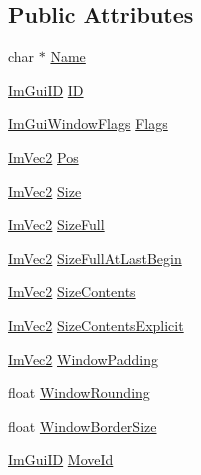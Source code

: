 \subsection*{Public Attributes}
\begin{DoxyCompactItemize}
\item 
char $\ast$ \mbox{\hyperlink{struct_im_gui_window_ab44252eb7d02d3f38249f5bac605037c}{Name}}
\item 
\mbox{\hyperlink{imgui_8h_a1785c9b6f4e16406764a85f32582236f}{Im\+Gui\+ID}} \mbox{\hyperlink{struct_im_gui_window_a5976b8d78bcc543ad7f23561f5cf0b8f}{ID}}
\item 
\mbox{\hyperlink{imgui_8h_a0b8e067ab4f7a818828c8d89e531addc}{Im\+Gui\+Window\+Flags}} \mbox{\hyperlink{struct_im_gui_window_a7c29e810a533b9a647cce5d93d45057f}{Flags}}
\item 
\mbox{\hyperlink{struct_im_vec2}{Im\+Vec2}} \mbox{\hyperlink{struct_im_gui_window_a1453f685401a44f76256fb54a4aac451}{Pos}}
\item 
\mbox{\hyperlink{struct_im_vec2}{Im\+Vec2}} \mbox{\hyperlink{struct_im_gui_window_a876e7aaf4cd824c8956238fba61387d5}{Size}}
\item 
\mbox{\hyperlink{struct_im_vec2}{Im\+Vec2}} \mbox{\hyperlink{struct_im_gui_window_ac3c7eb6b9cd556d56210cbb37caf0c74}{Size\+Full}}
\item 
\mbox{\hyperlink{struct_im_vec2}{Im\+Vec2}} \mbox{\hyperlink{struct_im_gui_window_a284ebffabfd60b81f363173be770cff0}{Size\+Full\+At\+Last\+Begin}}
\item 
\mbox{\hyperlink{struct_im_vec2}{Im\+Vec2}} \mbox{\hyperlink{struct_im_gui_window_a71097695729bf257ccaea824caf306a0}{Size\+Contents}}
\item 
\mbox{\hyperlink{struct_im_vec2}{Im\+Vec2}} \mbox{\hyperlink{struct_im_gui_window_a329d19a8805352b3a116e75e217d2155}{Size\+Contents\+Explicit}}
\item 
\mbox{\hyperlink{struct_im_vec2}{Im\+Vec2}} \mbox{\hyperlink{struct_im_gui_window_a538d3d70ad8f71a4ec58a6a0560b2f02}{Window\+Padding}}
\item 
float \mbox{\hyperlink{struct_im_gui_window_a871ebbbfdf354600a3833c270d6e6ef4}{Window\+Rounding}}
\item 
float \mbox{\hyperlink{struct_im_gui_window_ad51248766b9a815ce20b0d11e13b42b0}{Window\+Border\+Size}}
\item 
\mbox{\hyperlink{imgui_8h_a1785c9b6f4e16406764a85f32582236f}{Im\+Gui\+ID}} \mbox{\hyperlink{struct_im_gui_window_a680ac2168da85f59c35de8f0813224d6}{Move\+Id}}
\item 

\end{DoxyCompactItemize}
